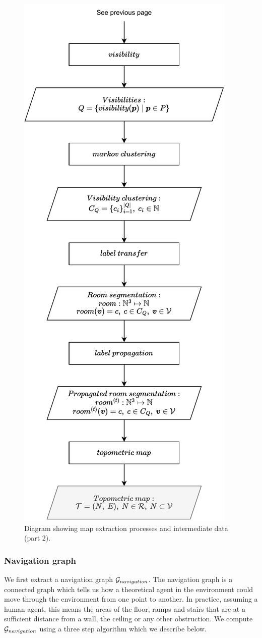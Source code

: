 \begin{figure}[p]
    \centering
    \includegraphics*[width=.55\textwidth]{./fig/flowchart_complete-Map extract_02.drawio.pdf}
    \caption{Diagram showing map extraction processes and intermediate data (part 2).}
    \label{fig:map_extract_steps_02}
\end{figure}

\subsubsection{Navigation graph}
We first extract a navigation graph \(\mathcal{G}_{navigation}\). The navigation graph is a connected graph which tells us how a theoretical agent in the environment could move through the environment from one point to another. In practice, assuming a human agent, this means the areas of the floor, ramps and stairs that are at a sufficient distance from a wall, the ceiling or any other obstruction. We compute \(\mathcal{G}_{navigation}\) using a three step algorithm which we describe below.


